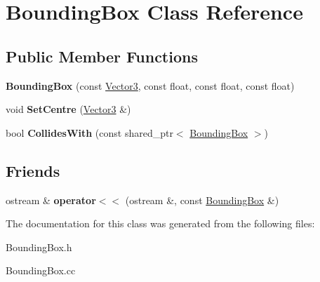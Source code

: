 \hypertarget{classBoundingBox}{}\section{Bounding\+Box Class Reference}
\label{classBoundingBox}
\subsection*{Public Member Functions}
\begin{DoxyCompactItemize}
\item 
\mbox{\label{classBoundingBox_a150ee0e10ba3ebf104a75cb75ec8325c}} 
{\bfseries Bounding\+Box} (const \hyperlink{classVector3}{Vector3}, const float, const float, const float)
\item 
\mbox{\label{classBoundingBox_a36b903eded5b5650c7486ae6a9364ac6}} 
void {\bfseries Set\+Centre} (\hyperlink{classVector3}{Vector3} \&)
\item 
\mbox{\label{classBoundingBox_a3a08436b44b078caab8d99eb89124a9a}} 
bool {\bfseries Collides\+With} (const shared\+\_\+ptr$<$ \hyperlink{classBoundingBox}{Bounding\+Box} $>$)
\end{DoxyCompactItemize}
\subsection*{Friends}
\begin{DoxyCompactItemize}
\item 
\mbox{\label{classBoundingBox_aac419ea220c5b99491665a2ae5e035f2}} 
ostream \& {\bfseries operator$<$$<$} (ostream \&, const \hyperlink{classBoundingBox}{Bounding\+Box} \&)
\end{DoxyCompactItemize}


The documentation for this class was generated from the following files\+:\begin{DoxyCompactItemize}
\item 
Bounding\+Box.\+h\item 
Bounding\+Box.\+cc\end{DoxyCompactItemize}
